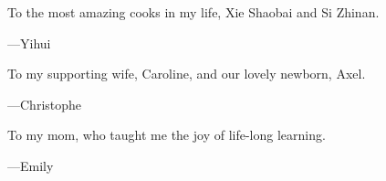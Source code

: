 \cleardoublepage\newpage\thispagestyle{empty}\null
\cleardoublepage\newpage\thispagestyle{empty}\null
\thispagestyle{empty}
\begin{large}
To the most amazing cooks in my life, Xie Shaobai and Si Zhinan.
\begin{flushright}
---Yihui
\end{flushright}

\bigskip

To my supporting wife, Caroline, and our lovely newborn, Axel.
\begin{flushright}
---Christophe
\end{flushright}

\bigskip

To my mom, who taught me the joy of life-long learning.
\begin{flushright}
---Emily
\end{flushright}
\end{large}

\setlength{\abovedisplayskip}{-5pt}
\setlength{\abovedisplayshortskip}{-5pt}
